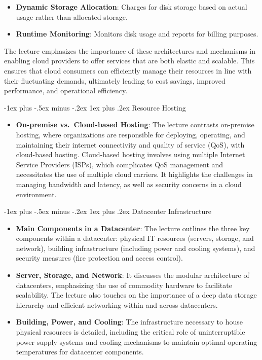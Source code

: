 \documentclass[10pt, landscape]{article}
\makeatletter
\renewcommand{\subsubsection}{\@startsection{subsubsection}{3}{0mm}%
  {-1ex plus -.5ex minus -.2ex}%
  {1ex plus .2ex}%
{\normalfont\small\bfseries}}%
\makeatother
\begin{document}
\begin{multicols*}{4}
\begin{itemize}
\tightlist
\item
  \textbf{Dynamic Storage Allocation}: Charges for disk storage based on
  actual usage rather than allocated storage.
\item
  \textbf{Runtime Monitoring}: Monitors disk usage and reports for
  billing purposes.
\end{itemize}

The lecture emphasizes the importance of these architectures and
mechanisms in enabling cloud providers to offer services that are both
elastic and scalable. This ensures that cloud consumers can efficiently
manage their resources in line with their fluctuating demands,
ultimately leading to cost savings, improved performance, and
operational efficiency.

\subsubsection{Resource Hosting}\label{resource-hosting}

\begin{itemize}
\tightlist
\item
  \textbf{On-premise vs.~Cloud-based Hosting}: The lecture contrasts
  on-premise hosting, where organizations are responsible for deploying,
  operating, and maintaining their internet connectivity and quality of
  service (QoS), with cloud-based hosting. Cloud-based hosting involves
  using multiple Internet Service Providers (ISPs), which complicates
  QoS management and necessitates the use of multiple cloud carriers. It
  highlights the challenges in managing bandwidth and latency, as well
  as security concerns in a cloud environment.
\end{itemize}

\subsubsection{Datacenter
Infrastructure}\label{datacenter-infrastructure}

\begin{itemize}
\tightlist
\item
  \textbf{Main Components in a Datacenter}: The lecture outlines the
  three key components within a datacenter: physical IT resources
  (servers, storage, and network), building infrastructure (including
  power and cooling systems), and security measures (fire protection and
  access control).
\item
  \textbf{Server, Storage, and Network}: It discusses the modular
  architecture of datacenters, emphasizing the use of commodity hardware
  to facilitate scalability. The lecture also touches on the importance
  of a deep data storage hierarchy and efficient networking within and
  across datacenters.
\item
  \textbf{Building, Power, and Cooling}: The infrastructure necessary to
  house physical resources is detailed, including the critical role of
  uninterruptible power supply systems and cooling mechanisms to
  maintain optimal operating temperatures for datacenter components.
\end{itemize}


\end{multicols*}
\end{document}
